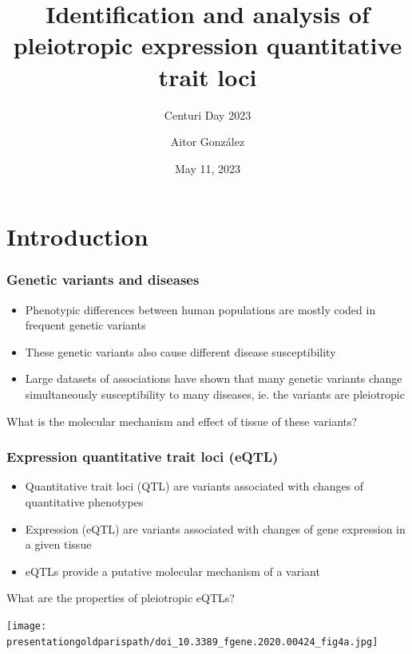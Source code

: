 \documentclass{beamer}
\title{Identification and analysis of pleiotropic expression quantitative trait loci}
\subtitle{Centuri Day 2023}
\author{Aitor Gonz\'alez}
\institute{Aix Marseille Univ, INSERM, TAGC}
\date{May 11, 2023}
\newcommand*{\presentationgoldparispath}{../presentation_230120_gold2022_paris/fig/}%
\begin{document}
    \begin{frame}

        \titlepage

    \end{frame}


    \section{Introduction} %

    \begin{frame}
        \frametitle{Genetic variants and diseases}

        \begin{itemize}
            \item Phenotypic differences between human populations are mostly coded in frequent genetic variants
            \item These genetic variants also cause different disease susceptibility
            \item Large datasets of associations have shown that many genetic variants change simultaneously susceptibility to many diseases, ie. the variants are pleiotropic
        \end{itemize}
%
        \vfill
%
        What is the molecular mechanism and effect of tissue of these variants?

    \end{frame}

    \begin{frame}
        \frametitle{Expression quantitative trait loci (eQTL)}

        \begin{itemize}
            \item Quantitative trait loci (QTL) are variants associated with changes of quantitative phenotypes
            \item Expression (eQTL) are variants associated with changes of gene expression in a given tissue
            \item eQTLs provide a putative molecular mechanism of a variant
        \end{itemize}
        \vfill
        What are the properties of pleiotropic eQTLs?

        \texttt{[image: \\presentationgoldparispath/doi\_10.3389\_fgene.2020.00424\_fig4a.jpg]}

        \let\thefootnote\relax{}
    \end{frame}
\end{document}
